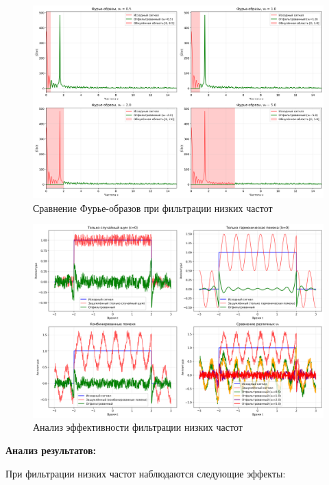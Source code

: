 \begin{figure}[H]
\centering
\includegraphics[width=\textwidth]{images/task1/low_freq_filter_freq_domain.png}
\caption{Сравнение Фурье-образов при фильтрации низких частот}
\end{figure}

\begin{figure}[H]
\centering
\includegraphics[width=\textwidth]{images/task1/low_freq_filter_analysis.png}
\caption{Анализ эффективности фильтрации низких частот}
\end{figure}

\textbf{Анализ результатов:}

При фильтрации низких частот наблюдаются следующие эффекты:

